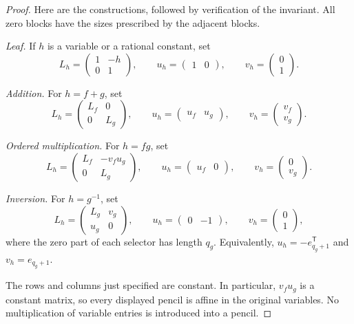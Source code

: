 \begin{proof}
Here are the constructions, followed by verification of the invariant.
All zero blocks have the sizes prescribed by the adjacent blocks.

\emph{Leaf.}  If $h$ is a variable or a rational constant, set
\[
 L_h=\begin{pmatrix}1&-h\\0&1\end{pmatrix},
 \qquad u_h=\begin{pmatrix}1&0\end{pmatrix},
 \qquad v_h=\begin{pmatrix}0\\1\end{pmatrix}.
\]

\emph{Addition.}  For $h=f+g$, set
\[
 L_h=\begin{pmatrix}L_f&0\\0&L_g\end{pmatrix},
 \qquad u_h=\begin{pmatrix}u_f&u_g\end{pmatrix},
 \qquad v_h=\begin{pmatrix}v_f\\v_g\end{pmatrix}.
\]

\emph{Ordered multiplication.}  For $h=fg$, set
\[
 L_h=\begin{pmatrix}L_f&-v_fu_g\\0&L_g\end{pmatrix},
 \qquad u_h=\begin{pmatrix}u_f&0\end{pmatrix},
 \qquad v_h=\begin{pmatrix}0\\v_g\end{pmatrix}.
\]

\emph{Inversion.}  For $h=g^{-1}$, set
\[
 L_h=\begin{pmatrix}L_g&v_g\\u_g&0\end{pmatrix},
 \qquad u_h=\begin{pmatrix}0&-1\end{pmatrix},
 \qquad v_h=\begin{pmatrix}0\\1\end{pmatrix},
\]
where the zero part of each selector has length $q_g$.  Equivalently,
$u_h=-e_{q_g+1}^{\mathsf T}$ and $v_h=e_{q_g+1}$.

The rows and columns just specified are constant.  In particular,
$v_fu_g$ is a constant matrix, so every displayed pencil is affine in
the original variables.  No multiplication of variable entries is
introduced into a pencil.


\end{proof}
